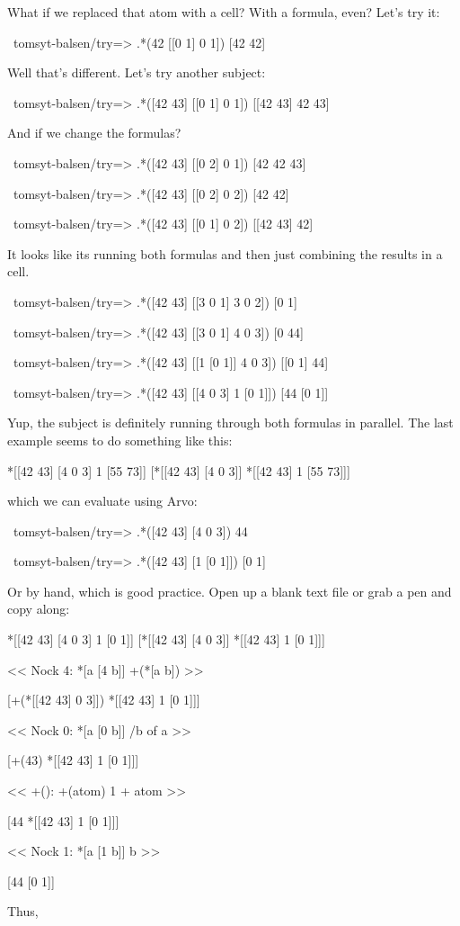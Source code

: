 What if we replaced that atom with a cell? With a formula, even? Let's try it:

\begin{code}
~tomsyt-balsen/try=> .*(42 [[0 1] 0 1])
[42 42]
\end{code}
Well that's different. Let's try another subject:

\begin{code}
~tomsyt-balsen/try=> .*([42 43] [[0 1] 0 1])
[[42 43] 42 43]
\end{code}
And if we change the formulas?

\begin{code}
~tomsyt-balsen/try=> .*([42 43] [[0 2] 0 1])
[42 42 43]

~tomsyt-balsen/try=> .*([42 43] [[0 2] 0 2])
[42 42]

~tomsyt-balsen/try=> .*([42 43] [[0 1] 0 2])
[[42 43] 42]
\end{code}
It looks like its running both formulas and then just combining the results in a cell.

\begin{code}
~tomsyt-balsen/try=> .*([42 43] [[3 0 1] 3 0 2])
[0 1]

~tomsyt-balsen/try=> .*([42 43] [[3 0 1] 4 0 3])
[0 44]

~tomsyt-balsen/try=> .*([42 43] [[1 [0 1]] 4 0 3])
[[0 1] 44]

~tomsyt-balsen/try=> .*([42 43] [[4 0 3] 1 [0 1]])
[44 [0 1]]
\end{code}
Yup, the subject is definitely running through both formulas in parallel. The
last example seems to do something like this:

\begin{code}
*[[42 43] [4 0 3] 1 [55 73]]         [*[[42 43] [4 0 3]] *[[42 43] 1 [55 73]]]
\end{code}
which we can evaluate using Arvo:

\begin{code}
~tomsyt-balsen/try=> .*([42 43] [4 0 3])
44

~tomsyt-balsen/try=> .*([42 43] [1 [0 1]])
[0 1]
\end{code}
Or by hand, which is good practice. Open up a blank text file or grab a pen and
copy along:

\begin{code}
*[[42 43] [4 0 3] 1 [0 1]]  [*[[42 43] [4 0 3]] *[[42 43] 1 [0 1]]]

<<  Nock 4:       *[a [4 b]]          +(*[a b]) >>

[+(*[[42 43] 0 3]]) *[[42 43] 1 [0 1]]]

<<  Nock 0:       *[a [0 b]]          /b of a  >>
       
[+(43) *[[42 43] 1 [0 1]]]

<<     +():       +(atom)             1 + atom  >>

[44 *[[42 43] 1 [0 1]]]

<<  Nock 1:       *[a [1 b]]          b  >>

[44 [0 1]] 
\end{code}
Thus,

